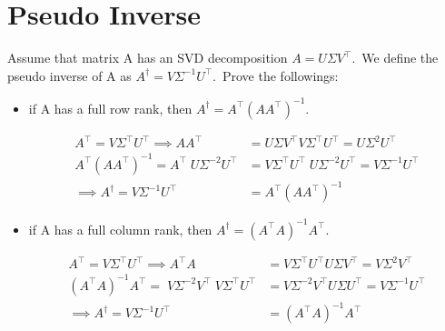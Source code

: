 \documentclass[12pt]{article}
\begin{document}
\section{Pseudo Inverse}
Assume that matrix A has an SVD decomposition $A = U\Sigma V^\top$.\, We define the pseudo inverse of A as $A^\dagger  = V\Sigma^{-1}U^\top$.\, Prove the followings:
\begin{itemize}
    \item if A has a full row rank, then $A^\dagger = A^\top (A A^\top)^{-1}$.
          \begin{qsolve}
              \begin{align*}
                  A^\top                 = V\Sigma^\top U^\top \implies A A^\top                         & = U \Sigma V^\top V \Sigma^\top U^\top = U \Sigma^2 U^\top            \\
                  A^\top (A A^\top)^{-1} = A^\top \; U \Sigma^{-2} U^\top                                & = V \Sigma^\top U^\top \; U \Sigma^{-2} U^\top = V \Sigma^{-1} U^\top \\
                  \implies A^\dagger                                              = V \Sigma^{-1} U^\top & = A^\top (A A^\top)^{-1}
              \end{align*}
          \end{qsolve}
    \item if A has a full column rank, then $A^\dagger = (A^\top A)^{-1} A^\top$.
          \begin{qsolve}
              \begin{align*}
                  A^\top                 = V\Sigma^\top U^\top \implies A^\top A                                   & = V \Sigma^\top U^\top U \Sigma V^\top = V \Sigma^2 V^\top    \\
                  (A^\top A)^{-1} A^\top = \; V \Sigma^{-2} V^\top \; V \Sigma^\top U^\top                         & = V \Sigma^{-2} V^\top U \Sigma U^\top = V \Sigma^{-1} U^\top \\
                  \implies A^\dagger                                                        = V \Sigma^{-1} U^\top & = (A^\top A)^{-1} A^\top
              \end{align*}
          \end{qsolve}
\end{itemize}
\clearpage
\end{document}
